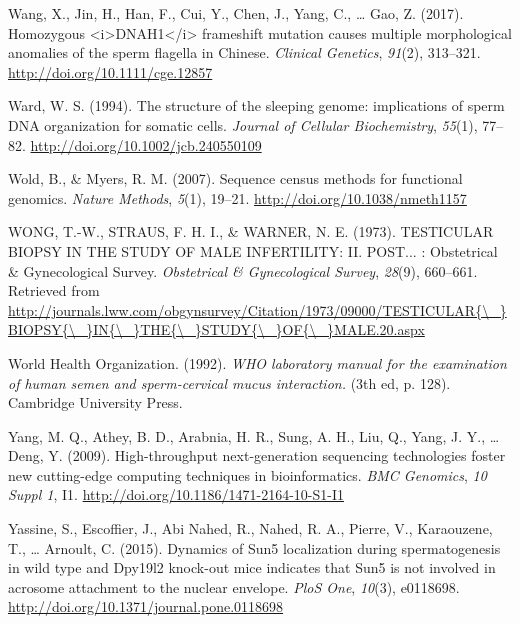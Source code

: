 \documentclass[12pt,twoside]{reedthesis}
\theoremstyle{definition}
\theoremstyle{definition}
\theoremstyle{remark}
\begin{document}
  \hypertarget{ref-Wang2017}{}
  Wang, X., Jin, H., Han, F., Cui, Y., Chen, J., Yang, C., \ldots{} Gao,
  Z. (2017). Homozygous
  \textless{}i\textgreater{}DNAH1\textless{}/i\textgreater{} frameshift
  mutation causes multiple morphological anomalies of the sperm flagella
  in Chinese. \emph{Clinical Genetics}, \emph{91}(2), 313--321.
  \url{http://doi.org/10.1111/cge.12857}
  
  \hypertarget{ref-Ward1994}{}
  Ward, W. S. (1994). The structure of the sleeping genome: implications
  of sperm DNA organization for somatic cells. \emph{Journal of Cellular
  Biochemistry}, \emph{55}(1), 77--82.
  \url{http://doi.org/10.1002/jcb.240550109}
  
  \hypertarget{ref-Wold2007}{}
  Wold, B., \& Myers, R. M. (2007). Sequence census methods for functional
  genomics. \emph{Nature Methods}, \emph{5}(1), 19--21.
  \url{http://doi.org/10.1038/nmeth1157}
  
  \hypertarget{ref-WONG1973}{}
  WONG, T.-W., STRAUS, F. H. I., \& WARNER, N. E. (1973). TESTICULAR
  BIOPSY IN THE STUDY OF MALE INFERTILITY: II. POST... : Obstetrical \&
  Gynecological Survey. \emph{Obstetrical \& Gynecological Survey},
  \emph{28}(9), 660--661. Retrieved from
  \href{http://journals.lww.com/obgynsurvey/Citation/1973/09000/TESTICULAR\%7B/_\%7DBIOPSY\%7B/_\%7DIN\%7B/_\%7DTHE\%7B/_\%7DSTUDY\%7B/_\%7DOF\%7B/_\%7DMALE.20.aspx}{http://journals.lww.com/obgynsurvey/Citation/1973/09000/TESTICULAR\{\textbackslash{}\_\}BIOPSY\{\textbackslash{}\_\}IN\{\textbackslash{}\_\}THE\{\textbackslash{}\_\}STUDY\{\textbackslash{}\_\}OF\{\textbackslash{}\_\}MALE.20.aspx}
  
  \hypertarget{ref-WorldHealthOrganization1992}{}
  World Health Organization. (1992). \emph{WHO laboratory manual for the
  examination of human semen and sperm-cervical mucus interaction.} (3th
  ed, p. 128). Cambridge University Press.
  
  \hypertarget{ref-Yang2009}{}
  Yang, M. Q., Athey, B. D., Arabnia, H. R., Sung, A. H., Liu, Q., Yang,
  J. Y., \ldots{} Deng, Y. (2009). High-throughput next-generation
  sequencing technologies foster new cutting-edge computing techniques in
  bioinformatics. \emph{BMC Genomics}, \emph{10 Suppl 1}, I1.
  \url{http://doi.org/10.1186/1471-2164-10-S1-I1}
  
  \hypertarget{ref-Yassine2015}{}
  Yassine, S., Escoffier, J., Abi Nahed, R., Nahed, R. A., Pierre, V.,
  Karaouzene, T., \ldots{} Arnoult, C. (2015). Dynamics of Sun5
  localization during spermatogenesis in wild type and Dpy19l2 knock-out
  mice indicates that Sun5 is not involved in acrosome attachment to the
  nuclear envelope. \emph{PloS One}, \emph{10}(3), e0118698.
  \url{http://doi.org/10.1371/journal.pone.0118698}
  
\end{document}
